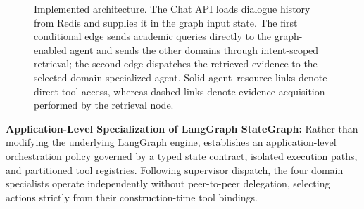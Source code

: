 \begin{figure}[!htbp]
\begin{tikzpicture}
\end{tikzpicture}
\caption{Implemented \system{} architecture. The Chat API loads dialogue history from Redis and supplies it in the graph input state. The first conditional edge sends academic queries directly to the graph-enabled agent and sends the other domains through intent-scoped retrieval; the second edge dispatches the retrieved evidence to the selected domain-specialized agent. Solid agent--resource links denote direct tool access, whereas dashed links denote evidence acquisition performed by the retrieval node.}
\label{fig:architecture}
\end{figure}
\FloatBarrier

\textbf{Application-Level Specialization of LangGraph StateGraph:}
Rather than modifying the underlying LangGraph engine, \system{} establishes an application-level orchestration policy governed by a typed state contract, isolated execution paths, and partitioned tool registries. Following supervisor dispatch, the four domain specialists operate independently without peer-to-peer delegation, selecting actions strictly from their construction-time tool bindings.

